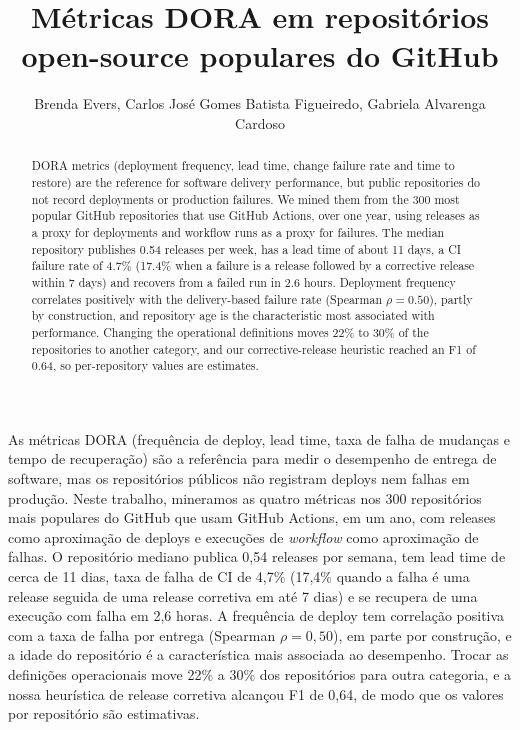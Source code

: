 \documentclass[12pt]{article}
\title{Métricas DORA em repositórios open-source populares do GitHub}
\author{Brenda Evers\inst{1}, Carlos José Gomes Batista Figueiredo\inst{1}, Gabriela Alvarenga Cardoso\inst{1}}
\begin{document}
\maketitle

\begin{abstract}
  DORA metrics (deployment frequency, lead time, change failure rate and time to restore) are the reference for software delivery performance, but public repositories do not record deployments or production failures. We mined them from the 300 most popular GitHub repositories that use GitHub Actions, over one year, using releases as a proxy for deployments and workflow runs as a proxy for failures. The median repository publishes 0.54 releases per week, has a lead time of about 11 days, a CI failure rate of 4.7\% (17.4\% when a failure is a release followed by a corrective release within 7 days) and recovers from a failed run in 2.6 hours. Deployment frequency correlates positively with the delivery-based failure rate (Spearman $\rho = 0.50$), partly by construction, and repository age is the characteristic most associated with performance. Changing the operational definitions moves 22\% to 30\% of the repositories to another category, and our corrective-release heuristic reached an F1 of 0.64, so per-repository values are estimates.
\end{abstract}

\begin{resumo}
  As métricas DORA (frequência de deploy, lead time, taxa de falha de mudanças e tempo de recuperação) são a referência para medir o desempenho de entrega de software, mas os repositórios públicos não registram deploys nem falhas em produção. Neste trabalho, mineramos as quatro métricas nos 300 repositórios mais populares do GitHub que usam GitHub Actions, em um ano, com releases como aproximação de deploys e execuções de \textit{workflow} como aproximação de falhas. O repositório mediano publica 0,54 releases por semana, tem lead time de cerca de 11 dias, taxa de falha de CI de 4,7\% (17,4\% quando a falha é uma release seguida de uma release corretiva em até 7 dias) e se recupera de uma execução com falha em 2,6 horas. A frequência de deploy tem correlação positiva com a taxa de falha por entrega (Spearman $\rho = 0{,}50$), em parte por construção, e a idade do repositório é a característica mais associada ao desempenho. Trocar as definições operacionais move 22\% a 30\% dos repositórios para outra categoria, e a nossa heurística de release corretiva alcançou F1 de 0,64, de modo que os valores por repositório são estimativas.
\end{resumo}
\end{document}
